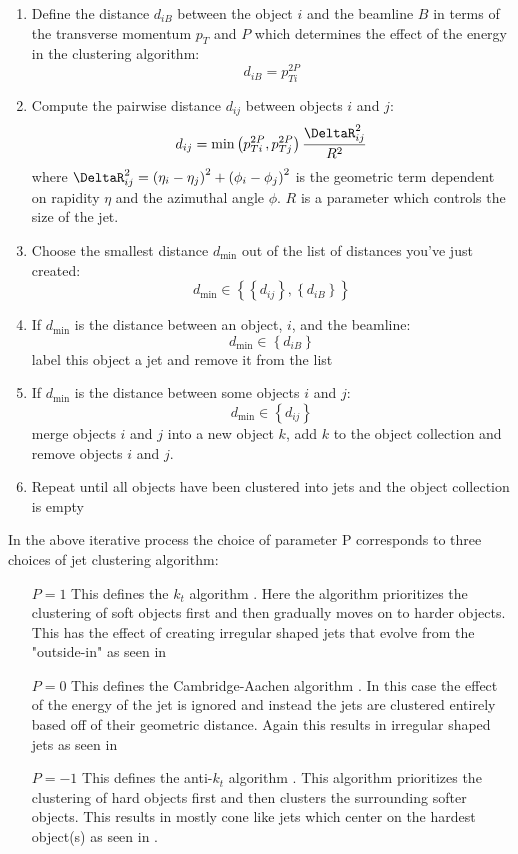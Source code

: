 \begin{enumerate}
  \item Define the distance $d_{iB}$ between the object $i$ and the beamline $B$ in terms of the transverse momentum $p_{T}$ and $P$ which determines the effect of the energy in the clustering algorithm: \[ d_{iB} = p_{Ti}^{2P} \]
  \item Compute the pairwise distance $d_{ij}$ between objects $i$ and $j$: \[ d_{ij} = \textrm{min}\left(p_{Ti}^{2P}, p_{Tj}^{2P}\right) \frac{\DeltaR_{ij}^{2}}{R^{2}} \] where $\DeltaR_{ij}^{2} = \left(\eta_{i} - \eta_{j}\right)^{2} + \left(\phi_{i} - \phi_{j}\right)^{2}$ is the geometric term dependent on rapidity $\eta$ and the azimuthal angle $\phi$.  $R$ is a parameter which controls the size of the jet.
  \item Choose the smallest distance $d_{\text{min}}$ out of the list of distances you've just created: \[ d_{\mathrm{min}} \in \left\{\left\{d_{ij}\right\},\left\{d_{iB}\right\}\right\} \] 
  \item If $d_{\text{min}}$ is the distance between an object, $i$, and the beamline: \[ d_{\mathrm{min}} \in \left\{d_{iB}\right\} \] label this object a jet and remove it from the list
  \item If $d_{\text{min}}$ is the distance between some objects $i$ and $j$: \[ d_{\mathrm{min}} \in \left\{d_{ij}\right\} \] merge objects $i$ and $j$ into a new object $k$, add $k$ to the object collection and remove objects $i$ and $j$.
  \item Repeat until all objects have been clustered into jets and the object collection is empty
\end{enumerate}

In the above iterative process the choice of parameter P corresponds to three choices of jet clustering algorithm:

\begin{enumerate}

  \item[$P = 1$] This defines the $k_{t}$ algorithm \cite{Catani:1993hr}.  Here the algorithm prioritizes the clustering of soft objects first and then gradually moves on to harder objects.  This has the effect of creating irregular shaped jets that evolve from the "outside-in" as seen in 
  \item[$P = 0$] This defines the Cambridge-Aachen algorithm \cite{Dokshitzer:1997in}.  In this case the effect of the energy of the jet is ignored and instead the jets are clustered entirely based off of their geometric distance.  Again this results in irregular shaped jets as seen in 
  \item[$P = -1$] This defines the anti-$k_{t}$ algorithm \cite{Cacciari:2008gp}.  This algorithm prioritizes the clustering of hard objects first and then clusters the surrounding softer objects.  This results in mostly cone like jets which center on the hardest object(s) as seen in .
\end{enumerate}


